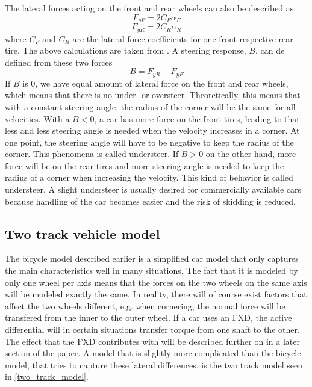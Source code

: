 The lateral forces acting on the front and rear wheels can also be described as 
\begin{equation}
	F_{yF} = 2C_{F}\alpha _{F}
\end{equation}
\begin{equation}
	F_{yR} = 2C_{R}\alpha _{R}
\end{equation}
where $ C_{F} $ and $ C_{R} $ are the lateral force coefficients for one front respective rear tire. The above calculations are taken from \cite{rajamani}. A steering response, $ B $, can de defined from these two forces \cite{fordonsdynamik99}
\begin{equation}
	B = F_{yR} - F_{yF}
\end{equation}
If $ B $ is 0, we have equal amount of lateral force on the front and rear wheels, which means that there is no under- or oversteer. Theoretically, this means that with a constant steering angle, the radius of the corner will be the same for all velocities. With a $ B < 0 $, a car has more force on the front tires, leading to that less and less steering angle is needed when the velocity increases in a corner. At one point, the steering angle will have to be negative to keep the radius of the corner. This phenomena is called understeer. If $ B > 0 $ on the other hand, more force will be on the rear tires and more steering angle is needed to keep the radius of a corner when increasing the velocity. This kind of behavior is called understeer. A slight understeer is usually desired for commercially available cars because handling of the car becomes easier and the risk of skidding is reduced.

\subsection{Two track vehicle model}

The bicycle model described earlier is a simplified car model that only captures the main characteristics well in many situations. The fact that it is modeled by only one wheel per axis means that the forces on the two wheels on the same axis will be modeled exactly the same. In reality, there will of course exist factors that affect the two wheels different, e.g. when cornering, the normal force will be transfered from the inner to the outer wheel. If a car uses an FXD, the active differential will in certain situations transfer torque from one shaft to the other. The effect that the FXD contributes with will be described further on in a later section of the paper. A model that is slightly more complicated than the bicycle model,  that tries to capture these lateral differences, is the two track model seen in \ref{two_track_model}. 

